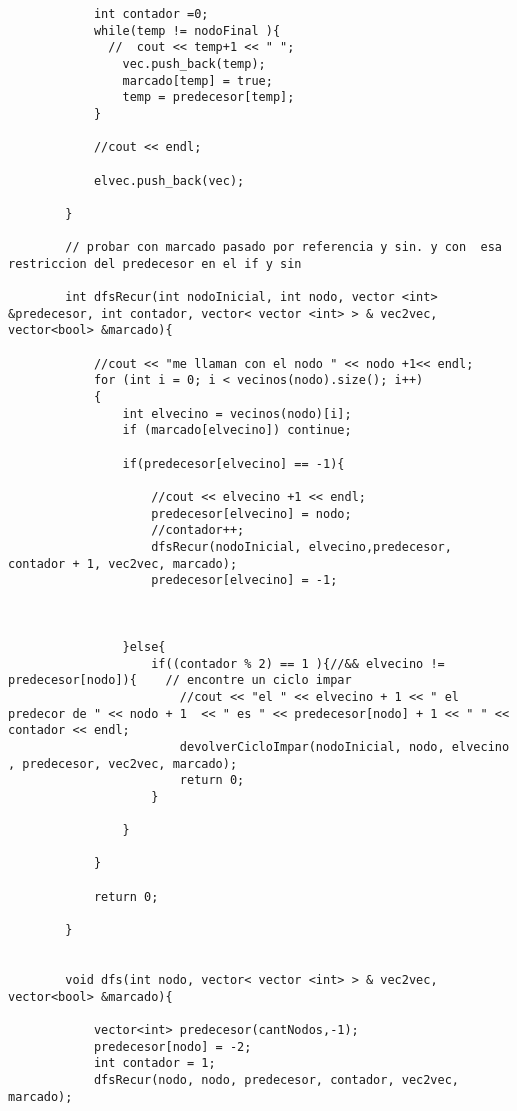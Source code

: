 \begin{lstlisting}
            int contador =0;
            while(temp != nodoFinal ){
              //  cout << temp+1 << " ";
                vec.push_back(temp);
                marcado[temp] = true;
                temp = predecesor[temp];
            }
            
            //cout << endl;
            
            elvec.push_back(vec);
      
        }

        // probar con marcado pasado por referencia y sin. y con  esa restriccion del predecesor en el if y sin

        int dfsRecur(int nodoInicial, int nodo, vector <int> &predecesor, int contador, vector< vector <int> > & vec2vec, vector<bool> &marcado){

            //cout << "me llaman con el nodo " << nodo +1<< endl;
            for (int i = 0; i < vecinos(nodo).size(); i++)
            {
                int elvecino = vecinos(nodo)[i]; 
                if (marcado[elvecino]) continue;

                if(predecesor[elvecino] == -1){

                    //cout << elvecino +1 << endl;
                    predecesor[elvecino] = nodo;
                    //contador++;
                    dfsRecur(nodoInicial, elvecino,predecesor, contador + 1, vec2vec, marcado);
                    predecesor[elvecino] = -1;



                }else{
                    if((contador % 2) == 1 ){//&& elvecino != predecesor[nodo]){    // encontre un ciclo impar
                        //cout << "el " << elvecino + 1 << " el predecor de " << nodo + 1  << " es " << predecesor[nodo] + 1 << " " <<  contador << endl;
                        devolverCicloImpar(nodoInicial, nodo, elvecino , predecesor, vec2vec, marcado);
                        return 0;
                    } 

                }

            }

            return 0;

        }


        void dfs(int nodo, vector< vector <int> > & vec2vec, vector<bool> &marcado){

            vector<int> predecesor(cantNodos,-1);
            predecesor[nodo] = -2;
            int contador = 1;
            dfsRecur(nodo, nodo, predecesor, contador, vec2vec, marcado);


\end{lstlisting}

